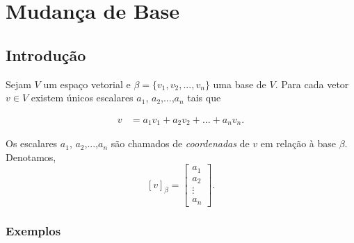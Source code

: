\chapter{Mudança de Base}
\thispagestyle{empty}

\section{Introdução}

Sejam $V$ um espaço vetorial  e $\beta=\{v_1, v_2,..., v_n \}$ uma base de $V$. Para cada vetor $v \in V$ existem únicos escalares $a_1$, $a_2$,...,$a_n$ tais que

\begin{align*}
v&=a_1v_1+ a_2v_2+ ...+a_nv_n .
\end{align*}

Os escalares $a_1$, $a_2$,...,$a_n$ são chamados de \textit{coordenadas} de $v$ em relação à base $\beta$. Denotamos, $$[v]_{\beta}=\left[ \begin{array}{c}a_1 \\a_2 \\ \vdots \\ a_n\end{array}\right ].$$

\subsection{Exemplos}


